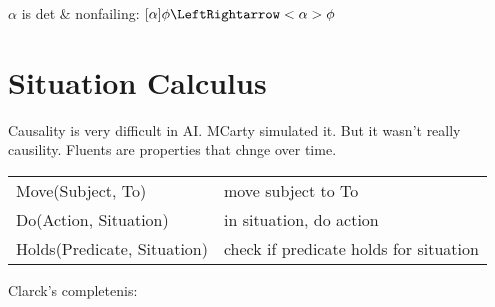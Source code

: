 \documentclass{article}
\begin{document}
\begin{prooftree}
\end{prooftree}
\begin{prooftree}
\end{prooftree}

$\alpha$ is det & nonfailing: $[\alpha]\phi\LeftRightarrow<\alpha>\phi$
\begin{prooftree}
\end{prooftree}
\section{Situation Calculus}
Causality is very difficult in AI. MCarty simulated it. But it wasn't really
causility.
Fluents are properties that chnge over time.

\begin{tabular}{ll}
Move(Subject, To) & move subject to To  \\
Do(Action, Situation) & in situation, do action\\
Holds(Predicate, Situation) & check if predicate holds for situation \\
\end{tabular}


Clarck's completenis:
\end{document}
